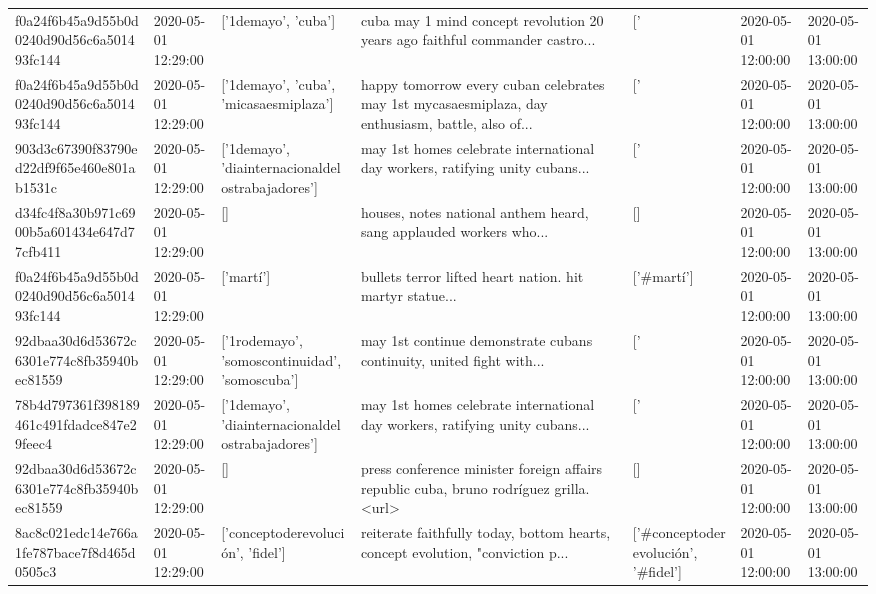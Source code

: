 \begin{tabular}{lllllll}
f0a24f6b45a9d55b0d0240d90d56c6a501493fc144 & 2020-05-01 12:29:00 & ['1demayo', 'cuba'] & cuba may 1 mind concept revolution 20 years ago faithful commander castro... & ['#1demayo', '#cuba'] & 2020-05-01 12:00:00 & 2020-05-01 13:00:00 \\
f0a24f6b45a9d55b0d0240d90d56c6a501493fc144 & 2020-05-01 12:29:00 & ['1demayo', 'cuba', 'micasaesmiplaza'] & happy tomorrow every cuban celebrates may 1st mycasaesmiplaza, day enthusiasm, battle, also of... & ['#1demayo', '#cuba', '#micasaesmiplaza'] & 2020-05-01 12:00:00 & 2020-05-01 13:00:00 \\
903d3c67390f83790ed22df9f65e460e801ab1531c & 2020-05-01 12:29:00 & ['1demayo', 'diainternacionaldelostrabajadores'] & may 1st homes celebrate international day workers, ratifying unity cubans... & ['#1demayo', '#diainternacionaldelostrabajadores'] & 2020-05-01 12:00:00 & 2020-05-01 13:00:00 \\
d34fc4f8a30b971c6900b5a601434e647d77cfb411 & 2020-05-01 12:29:00 & [] & houses, notes national anthem heard, sang applauded workers who... & [] & 2020-05-01 12:00:00 & 2020-05-01 13:00:00 \\
f0a24f6b45a9d55b0d0240d90d56c6a501493fc144 & 2020-05-01 12:29:00 & ['martí'] & bullets terror lifted heart nation. hit martyr statue... & ['#martí'] & 2020-05-01 12:00:00 & 2020-05-01 13:00:00 \\
92dbaa30d6d53672c6301e774c8fb35940bec81559 & 2020-05-01 12:29:00 & ['1rodemayo', 'somoscontinuidad', 'somoscuba'] & may 1st continue demonstrate cubans continuity, united fight with... & ['#1rodemayo', '#somoscontinuidad', '#somoscuba'] & 2020-05-01 12:00:00 & 2020-05-01 13:00:00 \\
78b4d797361f398189461c491fdadce847e29feec4 & 2020-05-01 12:29:00 & ['1demayo', 'diainternacionaldelostrabajadores'] & may 1st homes celebrate international day workers, ratifying unity cubans... & ['#1demayo', '#diainternacionaldelostrabajadores'] & 2020-05-01 12:00:00 & 2020-05-01 13:00:00 \\
92dbaa30d6d53672c6301e774c8fb35940bec81559 & 2020-05-01 12:29:00 & [] & press conference minister foreign affairs republic cuba, bruno rodríguez grilla. <url> & [] & 2020-05-01 12:00:00 & 2020-05-01 13:00:00 \\
8ac8c021edc14e766a1fe787bace7f8d465d0505c3 & 2020-05-01 12:29:00 & ['conceptoderevolución', 'fidel'] & reiterate faithfully today, bottom hearts, concept evolution, "conviction p... & ['#conceptoderevolución', '#fidel'] & 2020-05-01 12:00:00 & 2020-05-01 13:00:00 \\

\end{tabular}
